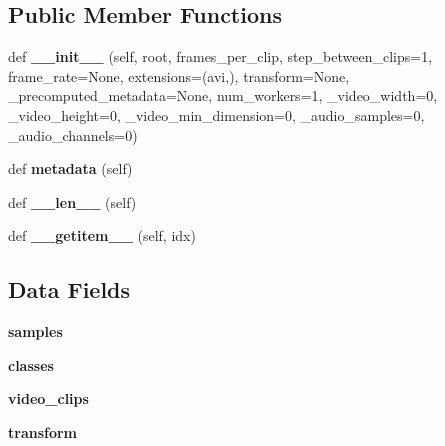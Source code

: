 \subsection*{Public Member Functions}
\begin{DoxyCompactItemize}
\item 
\mbox{\label{classtorchvision_1_1datasets_1_1kinetics_1_1Kinetics400_a7c7955c8a0f7fe8932305a7916d9ca08}} 
def {\bfseries \+\_\+\+\_\+init\+\_\+\+\_\+} (self, root, frames\+\_\+per\+\_\+clip, step\+\_\+between\+\_\+clips=1, frame\+\_\+rate=None, extensions=(\textquotesingle{}avi\textquotesingle{},), transform=None, \+\_\+precomputed\+\_\+metadata=None, num\+\_\+workers=1, \+\_\+video\+\_\+width=0, \+\_\+video\+\_\+height=0, \+\_\+video\+\_\+min\+\_\+dimension=0, \+\_\+audio\+\_\+samples=0, \+\_\+audio\+\_\+channels=0)
\item 
\mbox{\label{classtorchvision_1_1datasets_1_1kinetics_1_1Kinetics400_acea1d298f6dc8393bbe3ec55a7d6b4bf}} 
def {\bfseries metadata} (self)
\item 
\mbox{\label{classtorchvision_1_1datasets_1_1kinetics_1_1Kinetics400_a2d28fc93b3e79778847247b2188e4c7f}} 
def {\bfseries \+\_\+\+\_\+len\+\_\+\+\_\+} (self)
\item 
\mbox{\label{classtorchvision_1_1datasets_1_1kinetics_1_1Kinetics400_a1ff04f001e56fb7e27c98b928c0bb768}} 
def {\bfseries \+\_\+\+\_\+getitem\+\_\+\+\_\+} (self, idx)
\end{DoxyCompactItemize}
\subsection*{Data Fields}
\begin{DoxyCompactItemize}
\item 
\mbox{\label{classtorchvision_1_1datasets_1_1kinetics_1_1Kinetics400_a73a9781ac6c64d891ea6ad6bcbdf168c}} 
{\bfseries samples}
\item 
\mbox{\label{classtorchvision_1_1datasets_1_1kinetics_1_1Kinetics400_a829eb6d6f69ce1811510d7f58e240168}} 
{\bfseries classes}
\item 
\mbox{\label{classtorchvision_1_1datasets_1_1kinetics_1_1Kinetics400_ad17b7a4ea9ecd998daa15a48673ba226}} 
{\bfseries video\+\_\+clips}
\item 
\mbox{\label{classtorchvision_1_1datasets_1_1kinetics_1_1Kinetics400_ac1b5546bb5850ae013c901bb481ec642}} 
{\bfseries transform}
\end{DoxyCompactItemize}


